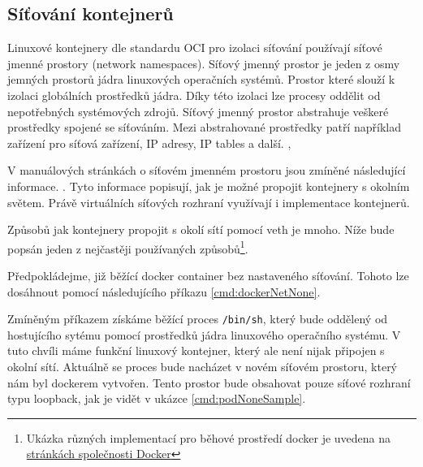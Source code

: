 \subsection{Síťování kontejnerů}\label{sitovaniKon}
Linuxové kontejnery dle standardu OCI pro izolaci síťování používají síťové jmenné prostory (network namespaces).
Síťový jmenný prostor je jeden z osmy jemných prostorů jádra linuxových operačních systémů. Prostor které slouží k izolaci globálních prostředků jádra. Díky této izolaci lze procesy oddělit od nepotřebných systémových zdrojů. Síťový jmenný prostor abstrahuje veškeré prostředky spojené se síťováním. Mezi abstrahované prostředky patří například zařízení pro síťová zařízení, IP adresy, IP tables a další. \cite{thelinuxmanpagesproject_2022_namespaces7}, \cite{thelinuxmanpagesproject_2022_network_namespaces7}

V manuálových stránkách o síťovém jmenném prostoru jsou zmíněné následující informace.  . \cite{thelinuxmanpagesproject_2022_network_namespaces7} Tyto informace popisují, jak je možné propojit kontejnery s okolním světem. Právě virtuálních síťových rozhraní využívají i implementace kontejnerů.    

Způsobů jak kontejnery propojit s okolí sítí pomocí veth je mnoho. Níže bude popsán jeden z nejčastěji používaných způsobů\footnote{Ukázka různých implementací pro běhové prostředí docker je uvedena na \href{https://docs.docker.com/network/}{stránkách společnosti Docker}}.

Předpokládejme, již běžící docker container bez nastaveného síťování. Tohoto lze dosáhnout pomocí následujícího příkazu \ref{cmd:dockerNetNone}.


Zmíněným příkazem získáme běžící proces \verb|/bin/sh|, který bude oddělený od hostujícího sytému pomocí prostředků jádra linuxového operačního systému. V tuto chvíli máme funkční linuxový kontejner, který ale není nijak připojen s okolní sítí. Aktuálně se proces bude nacházet v novém síťovém prostoru, který nám byl dockerem vytvořen. Tento prostor bude obsahovat pouze síťové rozhraní typu loopback, jak je vidět v ukázce \ref{cmd:podNoneSample}. 



